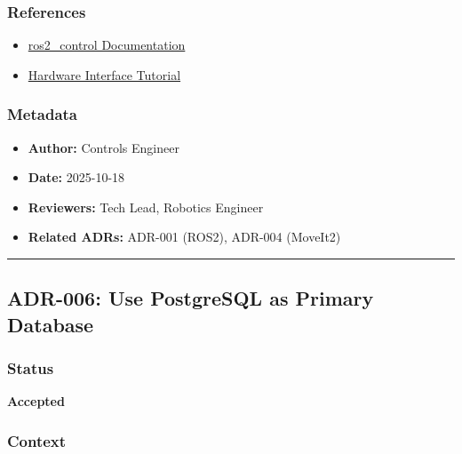 \documentclass[
]{article}
\providecommand{\tightlist}{%
  \setlength{\itemsep}{0pt}\setlength{\parskip}{0pt}}
\begin{document}
\hypertarget{references-4}{%
\subsubsection{References}\label{references-4}}

\begin{itemize}
\tightlist
\item
  \href{https://control.ros.org/humble/index.html}{ros2\_control
  Documentation}
\item
  \href{https://control.ros.org/humble/doc/getting_started/getting_started.html\#writing-a-hardware-component}{Hardware
  Interface Tutorial}
\end{itemize}

\hypertarget{metadata-4}{%
\subsubsection{Metadata}\label{metadata-4}}

\begin{itemize}
\tightlist
\item
  \textbf{Author:} Controls Engineer
\item
  \textbf{Date:} 2025-10-18
\item
  \textbf{Reviewers:} Tech Lead, Robotics Engineer
\item
  \textbf{Related ADRs:} ADR-001 (ROS2), ADR-004 (MoveIt2)
\end{itemize}

\begin{center}\rule{0.5\linewidth}{0.5pt}\end{center}

\hypertarget{adr-006-use-postgresql-as-primary-database}{%
\subsection{ADR-006: Use PostgreSQL as Primary
Database}\label{adr-006-use-postgresql-as-primary-database}}

\hypertarget{status-5}{%
\subsubsection{Status}\label{status-5}}

\textbf{Accepted}

\hypertarget{context-5}{%
\subsubsection{Context}\label{context-5}}
\end{document}
